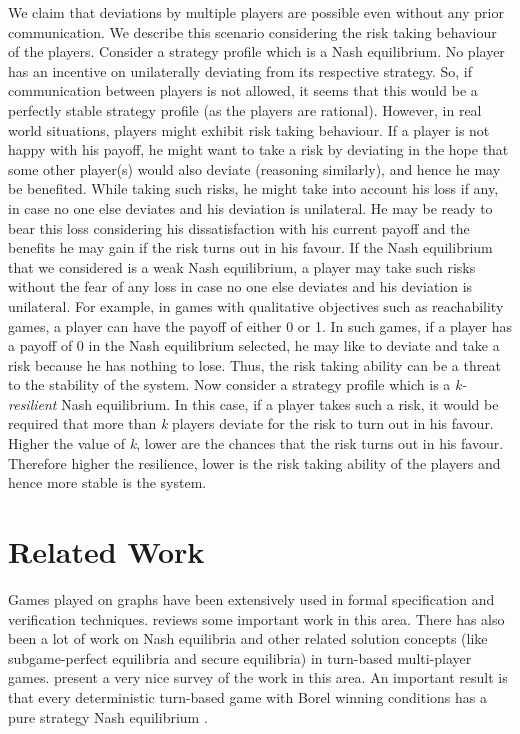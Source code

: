 We claim that deviations by multiple players are possible even without any prior communication. We describe this scenario considering the risk taking behaviour of the players. Consider a strategy profile which is a Nash equilibrium. No player has an incentive on unilaterally deviating from its respective strategy. So, if communication between players is not allowed, it seems that this would be a perfectly stable strategy profile (as the players are rational). However, in real world situations, players might exhibit risk taking behaviour. If a player is not happy with his payoff, he might want to take a risk by deviating in the hope that some other player(s) would also deviate (reasoning similarly), and hence he may be benefited. While taking such risks, he might take into account his loss if any, in case no one else deviates and his deviation is unilateral. He may be ready to bear this loss considering his dissatisfaction with his current payoff and the benefits he may gain if the risk turns out in his favour. If the Nash equilibrium that we considered is a weak Nash equilibrium, a player may take such risks without the fear of any loss in case no one else deviates and his deviation is unilateral. For example, in games with qualitative objectives such as reachability games, a player can have the payoff of either 0 or 1. In such games, if a player has a payoff of 0 in the Nash equilibrium selected, he may like to deviate and take a risk because he has nothing to lose. Thus, the risk taking ability can be a threat to the stability of the system. Now consider a strategy profile which is a \textit{k-resilient} Nash equilibrium. In this case, if a player takes such a risk, it would be required that more than \textit{k} players deviate for the risk to turn out in his favour. Higher the value of \textit{k}, lower are the chances that the risk turns out in his favour. Therefore higher the resilience, lower is the risk taking ability of the players and hence more stable is the system. 

\section{Related Work}

Games played on graphs have been extensively used in formal specification and verification techniques. \citet{9} reviews some important work in this area. There has also been a lot of work on Nash equilibria and other related solution concepts (like subgame-perfect equilibria and secure equilibria) in turn-based multi-player games. \citet{Ummels-2008} present a very nice survey of the work in this area. An important result is that every deterministic turn-based game with Borel winning conditions has a pure strategy Nash equilibrium \cite{6}.
 

